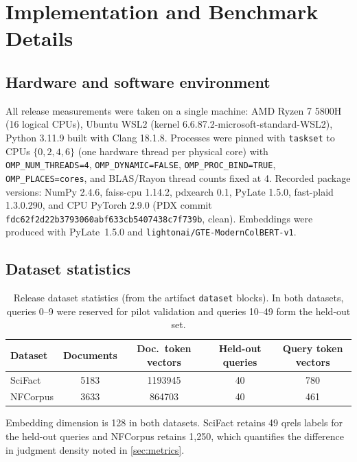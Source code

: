 \section{Implementation and Benchmark Details}
\label{app:details}

\subsection{Hardware and software environment}

All release measurements were taken on a single machine: AMD Ryzen 7 5800H
(16 logical CPUs), Ubuntu WSL2 (kernel 6.6.87.2-microsoft-standard-WSL2),
Python 3.11.9 built with Clang 18.1.8. Processes were pinned with
\texttt{taskset} to CPUs $\{0, 2, 4, 6\}$ (one hardware thread per physical
core) with \texttt{OMP\_NUM\_THREADS=4}, \texttt{OMP\_DYNAMIC=FALSE},
\texttt{OMP\_PROC\_BIND=TRUE}, \texttt{OMP\_PLACES=cores}, and BLAS/Rayon
thread counts fixed at 4. Recorded package versions: NumPy 2.4.6,
faiss-cpu 1.14.2, pdxearch 0.1, PyLate 1.5.0, fast-plaid 1.3.0.290, and CPU
PyTorch 2.9.0 (PDX commit
\texttt{fdc62f2d22b3793060abf633cb5407438c7f739b}, clean). Embeddings were
produced with PyLate~1.5.0 and
\texttt{lightonai/GTE-ModernColBERT-v1}.

\subsection{Dataset statistics}

\begin{table}[ht]
  \centering
  \caption{Release dataset statistics (from the artifact
    \texttt{dataset} blocks). In both datasets, queries 0--9 were reserved
    for pilot validation and queries 10--49 form the held-out set.}
  \label{tab:datasets}
  \small
  \begin{tabular}{@{}l S[table-format=4.0] S[table-format=7.0] S[table-format=2.0] S[table-format=3.0]@{}}
    \toprule
    Dataset & {Documents} & {Doc.\ token vectors} & {Held-out queries} & {Query token vectors} \\
    \midrule
    SciFact  & 5183 & 1193945 & 40 & 780 \\
    NFCorpus & 3633 &  864703 & 40 & 461 \\
    \bottomrule
  \end{tabular}
\end{table}

Embedding dimension is 128 in both datasets. SciFact retains 49 qrels labels
for the held-out queries and NFCorpus retains 1{,}250, which quantifies the
difference in judgment density noted in \cref{sec:metrics}.


